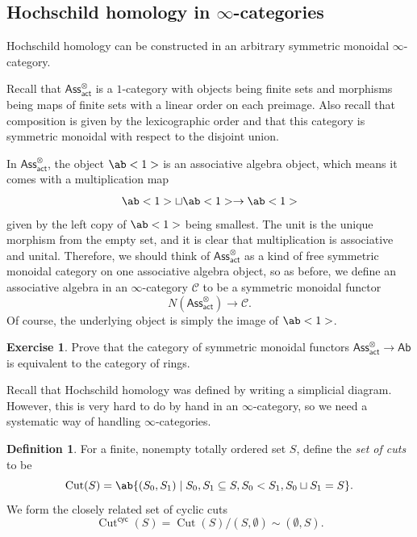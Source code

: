 \documentclass[10pt, oneside]{memoir}
\theoremstyle{definition}
\newtheorem{defn}[thm]{Definition}
\newtheorem{exer}[thm]{Exercise}
\theoremstyle{remark}
\theoremstyle{plain}
\theoremstyle{definition}
\theoremstyle{remark}
\newcommand{\mc}[1]{\mathcal{#1}}
\newcommand{\on}[1]{\operatorname{#1}}
\newcommand{\ms}[1]{\mathsf{#1}}
\newcommand{\1}{\mathbf{1}}
\newcommand{\2}{\mathbf{2}}
\newcommand{\3}{\mathbf{3}}
\begin{document}
\subsection{\texorpdfstring{Hochschild homology in \(\infty \)-categories}{Hochschild homology in infinity-categories}}%

Hochschild homology can be constructed in an arbitrary symmetric monoidal \(\infty \)-category.

Recall that \(\ms{Ass}^{\otimes}_{\ms{act}} \) is a \(1 \)-category with objects being finite sets and morphisms being maps of finite sets with a linear order on each preimage. Also recall that composition is given by the lexicographic order and that this category is symmetric monoidal with respect to the disjoint union.

In \(\ms{Ass}_{\ms{act}}^{\otimes} \), the object \(\ab<1> \) is an associative algebra object, which means it comes with a multiplication map
\[ \ab<1> \sqcup \ab<1> \to \ab<1> \]
given by the left copy of \(\ab<1> \) being smallest. The unit is the unique morphism from the empty set, and it is clear that multiplication is associative and unital. Therefore, we should think of \(\ms{Ass}_{\ms{act}}^{\otimes} \) as a kind of free symmetric monoidal category on one associative algebra object, so as before, we define an associative algebra in an \(\infty \)-category \(\mc{C} \) to be a symmetric monoidal functor
\[ N(\ms{Ass}_{\ms{act}}^{\otimes}) \to \mc{C}. \]
Of course, the underlying object is simply the image of \(\ab<1> \).

\begin{exer}
    Prove that the category of symmetric monoidal functors \(\ms{Ass}_{\ms{act}}^{\otimes} \to \ms{Ab} \) is equivalent to the category of rings.
\end{exer}

Recall that Hochschild homology was defined by writing a simplicial diagram. However, this is very hard to do by hand in an \(\infty \)-category, so we need a systematic way of handling \(\infty \)-categories.

\begin{defn}
    For a finite, nonempty totally ordered set \(S \), define the \textit{set of cuts} to be
    \[ \on{Cut}(S) = \ab\{ (S_0, S_1) \mid S_0, S_1 \subseteq S, S_0 < S_1, S_0 \sqcup S_1 = S \}. \]
    We form the closely related set of cyclic cuts
    \[ \on{Cut}^{\ms{cyc}}(S) = \on{Cut}(S) / (S, \emptyset) \sim (\emptyset, S). \]
\end{defn}
\end{document}
